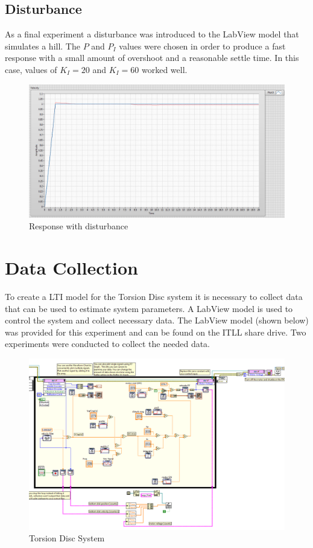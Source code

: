 \documentclass[11pt,titlepage]{article}
\begin{document}
	\subsection{Disturbance} 
		As a final experiment a disturbance was introduced to the LabView model that simulates a hill. The $P$ and $P_I$ values were chosen in order to produce a fast response with a small amount of overshoot and a reasonable settle time. In this case, values of $K_I=20$ and $K_I=60$ worked well.
		\begin{figure}[H]
			\centering
			\includegraphics[scale=.4]{disturbance}
			\caption{Response with disturbance}
		\end{figure}

\section{Data Collection}
	To create a LTI model for the Torsion Disc system it is necessary to collect data that can be used to estimate system parameters. A LabView model is used to control the system and collect necessary data. The LabView model (shown below) was provided for this experiment and can be found on the ITLL share drive. Two experiments were conducted to collect the needed data.
	\begin{figure}[H]
			\centering
			\includegraphics[scale=0.4]{labviewModel}
			\caption{Torsion Disc System}
	\end{figure}
\end{document}
